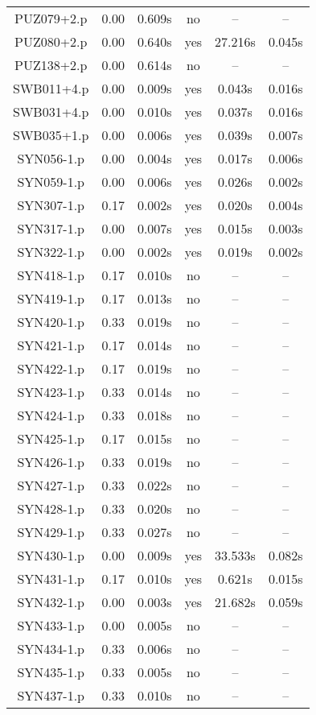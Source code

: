 \begin{center}
\begin{longtable}{||c | c | c | c | c | c||}
PUZ079+2.p & 0.00 & 0.609s & no & -- & -- \\
PUZ080+2.p & 0.00 & 0.640s & yes & 27.216s & 0.045s \\
PUZ138+2.p & 0.00 & 0.614s & no & -- & -- \\
SWB011+4.p & 0.00 & 0.009s & yes & 0.043s & 0.016s \\
SWB031+4.p & 0.00 & 0.010s & yes & 0.037s & 0.016s \\
SWB035+1.p & 0.00 & 0.006s & yes & 0.039s & 0.007s \\
SYN056-1.p & 0.00 & 0.004s & yes & 0.017s & 0.006s \\
SYN059-1.p & 0.00 & 0.006s & yes & 0.026s & 0.002s \\
SYN307-1.p & 0.17 & 0.002s & yes & 0.020s & 0.004s \\
SYN317-1.p & 0.00 & 0.007s & yes & 0.015s & 0.003s \\
SYN322-1.p & 0.00 & 0.002s & yes & 0.019s & 0.002s \\
SYN418-1.p & 0.17 & 0.010s & no & -- & -- \\
SYN419-1.p & 0.17 & 0.013s & no & -- & -- \\
SYN420-1.p & 0.33 & 0.019s & no & -- & -- \\
SYN421-1.p & 0.17 & 0.014s & no & -- & -- \\
SYN422-1.p & 0.17 & 0.019s & no & -- & -- \\
SYN423-1.p & 0.33 & 0.014s & no & -- & -- \\
SYN424-1.p & 0.33 & 0.018s & no & -- & -- \\
SYN425-1.p & 0.17 & 0.015s & no & -- & -- \\
SYN426-1.p & 0.33 & 0.019s & no & -- & -- \\
SYN427-1.p & 0.33 & 0.022s & no & -- & -- \\
SYN428-1.p & 0.33 & 0.020s & no & -- & -- \\
SYN429-1.p & 0.33 & 0.027s & no & -- & -- \\
SYN430-1.p & 0.00 & 0.009s & yes & 33.533s & 0.082s \\
SYN431-1.p & 0.17 & 0.010s & yes & 0.621s & 0.015s \\
SYN432-1.p & 0.00 & 0.003s & yes & 21.682s & 0.059s \\
SYN433-1.p & 0.00 & 0.005s & no & -- & -- \\
SYN434-1.p & 0.33 & 0.006s & no & -- & -- \\
SYN435-1.p & 0.33 & 0.005s & no & -- & -- \\
SYN437-1.p & 0.33 & 0.010s & no & -- & -- \\

\end{longtable}
\end{center}

